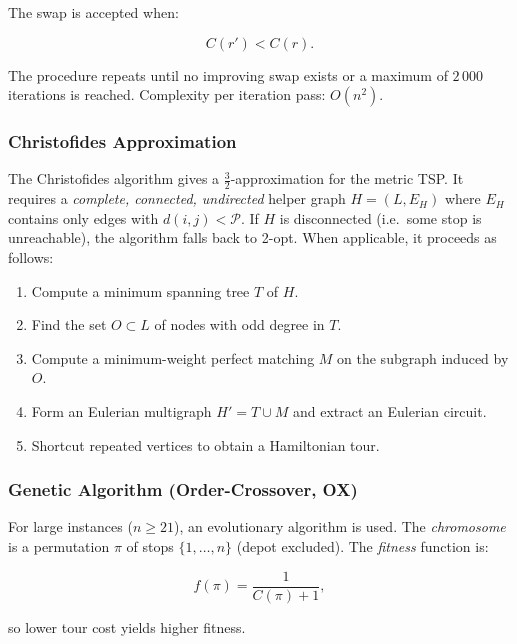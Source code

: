 \documentclass[12pt, a4paper]{article}
\theoremstyle{definition}
\begin{document}
The swap is accepted when:

\begin{equation}
  \label{eq:2opt}
  C(r') < C(r).
\end{equation}

The procedure repeats until no improving swap exists or a maximum of
$2\,000$ iterations is reached.  Complexity per iteration pass: $O(n^2)$.

\subsubsection{Christofides Approximation}

The Christofides algorithm gives a $\tfrac{3}{2}$-approximation for the metric
TSP.  It requires a \emph{complete, connected, undirected} helper graph
$H = (L, E_H)$ where $E_H$ contains only edges with $d(i,j) < \mathcal{P}$.
If $H$ is disconnected (i.e.\ some stop is unreachable), the algorithm falls
back to 2-opt.  When applicable, it proceeds as follows:

\begin{enumerate}[noitemsep]
  \item Compute a minimum spanning tree $T$ of $H$.
  \item Find the set $O \subset L$ of nodes with odd degree in $T$.
  \item Compute a minimum-weight perfect matching $M$ on the subgraph
        induced by $O$.
  \item Form an Eulerian multigraph $H' = T \cup M$ and extract an
        Eulerian circuit.
  \item Shortcut repeated vertices to obtain a Hamiltonian tour.
\end{enumerate}

\subsubsection{Genetic Algorithm (Order-Crossover, OX)}

For large instances ($n \geq 21$), an evolutionary algorithm is used.  The
\emph{chromosome} is a permutation $\pi$ of stops $\{1,\ldots,n\}$ (depot
excluded).  The \emph{fitness} function is:

\begin{equation}
  \label{eq:fitness}
  f(\pi) = \frac{1}{C(\pi) + 1},
\end{equation}

\noindent so lower tour cost yields higher fitness.
\end{document}
